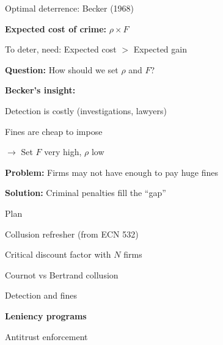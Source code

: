 \documentclass[notes,11pt, aspectratio=169]{beamer}
\newenvironment{wideitemize}{\itemize\addtolength{\itemsep}{10pt}}{\enditemize}
\newenvironment{wideenumerate}{\enumerate\addtolength{\itemsep}{10pt}}{\endenumerate}
\begin{document}
\begin{frame}{Optimal deterrence: Becker (1968)}
	\begin{wideitemize}
		\item \textbf{Expected cost of crime:} $\rho \times F$
		\item To deter, need: Expected cost $>$ Expected gain
		\item \textbf{Question:} How should we set $\rho$ and $F$?
		\item \textbf{Becker's insight:}
		\begin{wideitemize}
			\vspace{5pt}
			\item Detection is costly (investigations, lawyers)
			\item Fines are cheap to impose
			\item $\rightarrow$ Set $F$ very high, $\rho$ low
		\end{wideitemize}
		\item \textbf{Problem:} Firms may not have enough to pay huge fines
		\item \textbf{Solution:} Criminal penalties fill the ``gap''
	\end{wideitemize}
\end{frame}

\begin{frame}{Plan}
  \begin{wideenumerate}
    \item Collusion refresher (from ECN 532)
    \item Critical discount factor with $N$ firms
    \item Cournot vs Bertrand collusion
    \item Detection and fines
    \item \textbf{Leniency programs}
    \item Antitrust enforcement
  \end{wideenumerate}
\end{frame}
\end{document}
